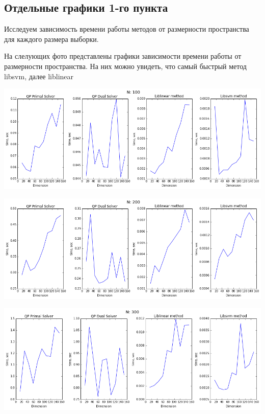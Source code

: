 \documentclass[12pt, a4paper]{article}
\begin{document}
		\subsection{Отдельные графики 1-го пункта}
			Исследуем зависимость времени работы методов от размерности пространства для каждого размера выборки.
			
			На слелующих фото представлены графики зависимости времени работы от размерности пространства. На них можно увидеть, что самый быстрый метод libsvm, далее liblinear

			\begin{center}
				\includegraphics[width=18cm]{1par_N100.png}
			\end{center}

			\begin{center}
				\includegraphics[width=18cm]{1par_N200.png}
			\end{center}

			\begin{center}
				\includegraphics[width=18cm]{1par_N300.png}
			\end{center}
\end{document}
